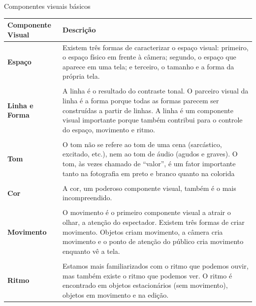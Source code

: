 \begin{quadro}
	\centering

	\caption{Componentes visuais básicos}
	\begin{tabular}{m{.2\linewidth}m{.7\linewidth}}
		\toprule
		\centering\textbf{Componente Visual} & \centering\textbf{Descrição} \tabularnewline
		\midrule
		\textbf{Espaço}                      & Existem três formas de caracterizar o espaço visual:
		primeiro, o espaço físico em frente à câmera; segundo, o espaço que
		aparece em uma tela; e terceiro, o tamanho e a forma da própria
		tela.\tabularnewline
		                                     & \tabularnewline
		\textbf{Linha e Forma}               & A linha é o resultado do contraste tonal. O
		parceiro visual da linha é a forma porque todas as formas parecem ser
		construídas a partir de linhas. A linha é um componente visual
		importante porque também contribui para o controle do espaço, movimento
		e ritmo.\tabularnewline
		                                     & \tabularnewline
		\textbf{Tom}                         & O tom não se refere ao tom de uma cena (sarcástico,
		excitado, etc.), nem ao tom de áudio (agudos e graves). O tom, às vezes
		chamado de \enquote{valor}, é um fator importante tanto na fotografia em preto e
		branco quanto na colorida\tabularnewline
		                                     & \tabularnewline
		\textbf{Cor}                         & A cor, um poderoso componente visual, também é o mais
		incompreendido.\tabularnewline
		                                     & \tabularnewline
		\textbf{Movimento}                   & O movimento é o primeiro componente visual a atrair
		o olhar, a atenção do espectador. Existem três formas de criar
		movimento. Objetos criam movimento, a câmera cria movimento e o ponto de
		atenção do público cria movimento enquanto vê a tela.\tabularnewline
		                                     & \tabularnewline
		\textbf{Ritmo}                       & Estamos mais familiarizados com o ritmo que podemos
		ouvir, mas também existe o ritmo que podemos ver. O ritmo é encontrado
		em objetos estacionários (sem movimento), objetos em movimento e na
		edição.\tabularnewline
		\bottomrule
	\end{tabular}
\end{quadro}

